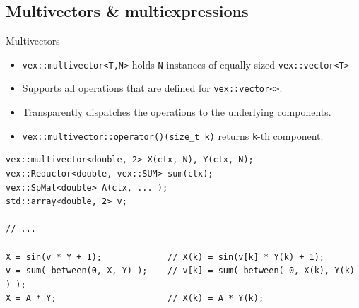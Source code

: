 \documentclass[@BEAMER_OPTIONS@]{beamer}
\newcommand{\code}[1]{\lstinline|#1|}
\begin{document}
\note{ }

\subsection{Multivectors \& multiexpressions}

\begin{frame}[fragile]{Multivectors}
    \begin{itemize}
        \item \code{vex::multivector<T,N>} holds \code{N} instances of equally
            sized \code{vex::vector<T>}
        \item Supports all operations that are defined for
            \code{vex::vector<>}.
        \item Transparently dispatches the operations to the underlying
            components.
        \item \code{vex::multivector::operator()(size_t k)} returns \code{k}-th
            component.
    \end{itemize}
    \begin{exampleblock}{}
        \begin{lstlisting}
vex::multivector<double, 2> X(ctx, N), Y(ctx, N);
vex::Reductor<double, vex::SUM> sum(ctx);
vex::SpMat<double> A(ctx, ... );
std::array<double, 2> v;

// ...

X = sin(v * Y + 1);             // X(k) = sin(v[k] * Y(k) + 1);
v = sum( between(0, X, Y) );    // v[k] = sum( between( 0, X(k), Y(k) ) );
X = A * Y;                      // X(k) = A * Y(k);
        \end{lstlisting}
    \end{exampleblock}
\end{frame}

\end{document}
